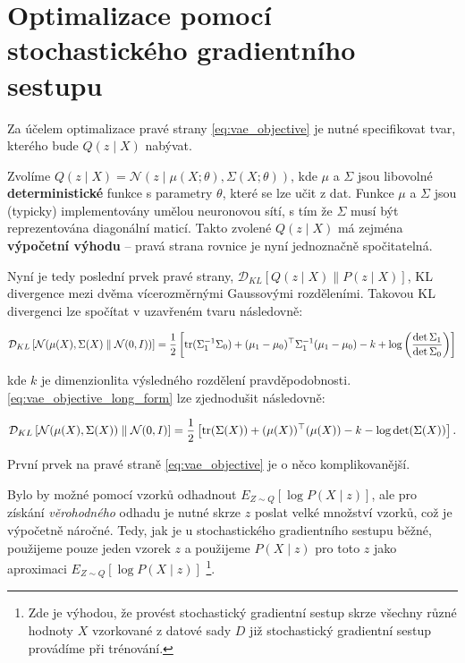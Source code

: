 \section{Optimalizace pomocí stochastického gradientního sestupu}

Za účelem optimalizace pravé strany \autoref{eq:vae_objective} je nutné specifikovat tvar, kterého bude $Q(z\mid X)$ nabývat.

Zvolíme $Q(z\mid X) = \mathcal{N}(z\mid \mu(X;\theta),\Sigma(X;\theta))$, kde $\mu$ a $\Sigma$ jsou libovolné \textbf{deterministické} funkce s parametry $\theta$, které se lze učit z dat.
Funkce $\mu$ a $\Sigma$ jsou (typicky) implementovány umělou neuronovou sítí, s tím že $\Sigma$ musí být reprezentována diagonální maticí.
Takto zvolené $Q(z\mid X)$ má zejména \textbf{výpočetní výhodu} – pravá strana rovnice je nyní jednoznačně spočitatelná.

Nyní je tedy poslední prvek pravé strany, $\mathcal{D}_{KL}\left[ Q(z \mid X)\parallel P(z\mid X) \right]$, KL divergence mezi dvěma vícerozměrnými Gaussovými rozděleními.
Takovou KL divergenci lze spočítat v uzavřeném tvaru následovně:

\begin{equation}\label{eq:vae_objective_long_form}
    \mathcal{D}_{KL} \left[ \mathcal{N}(\mu(X), \Sigma(X)\parallel \mathcal{N}(0, I)) \right] = 
    \frac{1}{2}\left[ \operatorname{\text{tr}} (\Sigma_1^{-1}\Sigma_0) + (\mu_1 - \mu_0)^\top \Sigma_1^{-1}(\mu_1 - \mu_0) - k + \log \left(\frac{\det \Sigma_1}{\det \Sigma_0} \right) \right]
\end{equation}

kde $k$ je dimenzionlita výsledného rozdělení pravděpodobnosti. \autoref{eq:vae_objective_long_form} lze zjednodušit následovně:

\begin{equation}
    \mathcal{D}_{KL} \left[ \mathcal{N}(\mu(X), \Sigma(X)) \parallel \mathcal{N}(0, I) \right] = 
    \frac{1}{2} \left[ \operatorname{\text{tr}} (\Sigma(X)) + (\mu(X))^\top (\mu(X)) - k - \log \det (\Sigma(X)) \right].
\end{equation}

První prvek na pravé straně \autoref{eq:vae_objective} je o něco komplikovanější.

Bylo by možné pomocí vzorků odhadnout $E_{Z\sim Q}[\log P(X\mid z)]$, ale pro získání \emph{věrohodného} odhadu je nutné skrze $z$ poslat velké množství vzorků, což je výpočetně náročné.
Tedy, jak je u stochastického gradientního sestupu běžné, použijeme pouze jeden vzorek $z$ a použijeme $P(X\mid z)$ pro toto $z$ jako aproximaci $E_{Z\sim Q}[\log P(X\mid z)]$
\footnote{Zde je výhodou, že provést stochastický gradientní sestup skrze všechny různé hodnoty $X$ vzorkované z datové sady $D$ již stochastický gradientní sestup provádíme při trénování.}.

